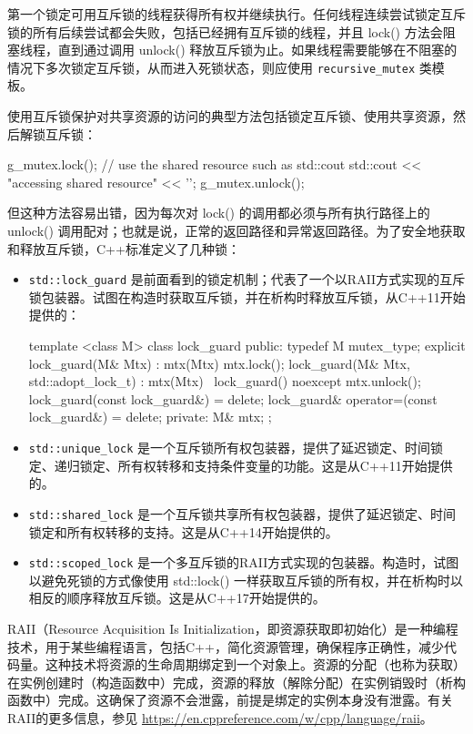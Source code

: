 第一个锁定可用互斥锁的线程获得所有权并继续执行。任何线程连续尝试锁定互斥锁的所有后续尝试都会失败，包括已经拥有互斥锁的线程，并且 lock() 方法会阻塞线程，直到通过调用 unlock() 释放互斥锁为止。如果线程需要能够在不阻塞的情况下多次锁定互斥锁，从而进入死锁状态，则应使用 \verb|recursive_mutex| 类模板。

使用互斥锁保护对共享资源的访问的典型方法包括锁定互斥锁、使用共享资源，然后解锁互斥锁：

\begin{cpp}
g_mutex.lock();
// use the shared resource such as std::cout
std::cout << "accessing shared resource" << '\n';
g_mutex.unlock();
\end{cpp}

但这种方法容易出错，因为每次对 lock() 的调用都必须与所有执行路径上的 unlock() 调用配对；也就是说，正常的返回路径和异常返回路径。为了安全地获取和释放互斥锁，C++标准定义了几种锁：

\begin{itemize}
\item
\verb|std::lock_guard| 是前面看到的锁定机制；代表了一个以RAII方式实现的互斥锁包装器。试图在构造时获取互斥锁，并在析构时释放互斥锁，从C++11开始提供的：

\begin{cpp}
template <class M>
class lock_guard
{
public:
    typedef M mutex_type;
    explicit lock_guard(M& Mtx) : mtx(Mtx)
    {
        mtx.lock();
    }
    lock_guard(M& Mtx, std::adopt_lock_t) : mtx(Mtx)
    { }
    ~lock_guard() noexcept
    {
        mtx.unlock();
    }
    lock_guard(const lock_guard&) = delete;
    lock_guard& operator=(const lock_guard&) = delete;
private:
    M& mtx;
};
\end{cpp}

\item
\verb|std::unique_lock| 是一个互斥锁所有权包装器，提供了延迟锁定、时间锁定、递归锁定、所有权转移和支持条件变量的功能。这是从C++11开始提供的。

\item
\verb|std::shared_lock| 是一个互斥锁共享所有权包装器，提供了延迟锁定、时间锁定和所有权转移的支持。这是从C++14开始提供的。

\item
\verb|std::scoped_lock| 是一个多互斥锁的RAII方式实现的包装器。构造时，试图以避免死锁的方式像使用 std::lock() 一样获取互斥锁的所有权，并在析构时以相反的顺序释放互斥锁。这是从C++17开始提供的。
\end{itemize}

\begin{myNotic}
RAII（Resource Acquisition Is Initialization，即资源获取即初始化）是一种编程技术，用于某些编程语言，包括C++，简化资源管理，确保程序正确性，减少代码量。这种技术将资源的生命周期绑定到一个对象上。资源的分配（也称为获取）在实例创建时（构造函数中）完成，资源的释放（解除分配）在实例销毁时（析构函数中）完成。这确保了资源不会泄露，前提是绑定的实例本身没有泄露。有关RAII的更多信息，参见 \url{https://en.cppreference.com/w/cpp/language/raii}。
\end{myNotic}

